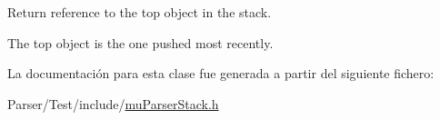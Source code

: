 Return reference to the top object in the stack. 

The top object is the one pushed most recently. 

La documentación para esta clase fue generada a partir del siguiente fichero\+:\begin{DoxyCompactItemize}
\item 
Parser/\+Test/include/\hyperlink{mu_parser_stack_8h}{mu\+Parser\+Stack.\+h}\end{DoxyCompactItemize}
